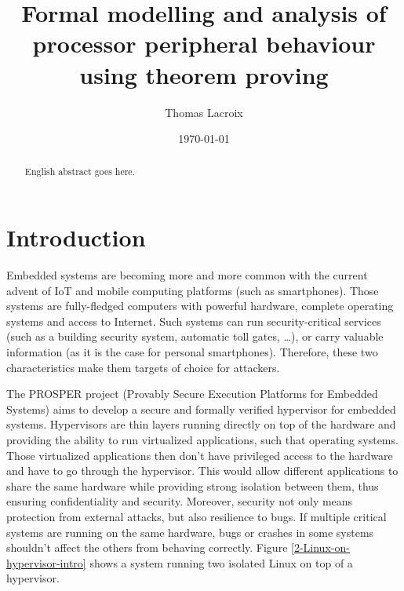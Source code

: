 \documentclass{kththesis}
\title{Formal modelling and analysis of processor peripheral behaviour using theorem proving}
\author{Thomas Lacroix}
\date{\today}
\begin{document}
\frontmatter %

\titlepage

\begin{abstract}
  English abstract goes here.
\end{abstract}


\tableofcontents

\mainmatter %



\printglossaries

\chapter{Introduction}

Embedded systems are becoming more and more common with the current advent of IoT and mobile computing platforms (such as smartphones). Those systems are fully-fledged computers with powerful hardware, complete operating systems and access to Internet. Such systems can run security-critical services (such as a building security system, automatic toll gates, \dots), or carry valuable information (as it is the case for personal smartphones). Therefore, these two characteristics make them targets of choice for attackers.

The PROSPER project \cite{noauthor_prosper:_nodate} (Provably Secure Execution Platforms for Embedded Systems) aims to develop a secure and formally verified hypervisor for embedded systems. Hypervisors are thin layers running directly on top of the hardware and providing the ability to run virtualized applications, such that operating systems. Those virtualized applications then don't have privileged access to the hardware and have to go through the hypervisor. This would allow different applications to share the same hardware while providing strong isolation between them, thus ensuring confidentiality and security. Moreover, security not only means protection from external attacks, but also resilience to bugs. If multiple critical systems are running on the same hardware, bugs or crashes in some systems shouldn't affect the others from behaving correctly. Figure \ref{2-Linux-on-hypervisor-intro} shows a system running two isolated Linux on top of a hypervisor.
\end{document}
